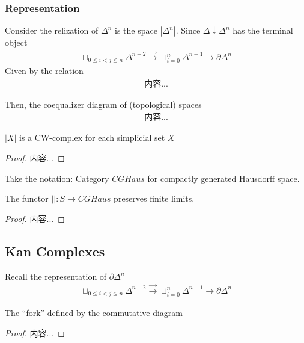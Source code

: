 \documentclass[Total.tex]{subfiles}
\begin{document}
			\subsubsection{Representation}
				Consider the relization of $\Delta^n$ is the space $|\Delta^n|$. Since $\Delta\downarrow \Delta^n$ has the terminal object
				\begin{gather*}
					\sqcup_{0\leq i<j\leq n}\Delta^{n-2}\stackrel{\rightarrow}{\rightarrow} \sqcup_{i=0}^n \Delta^{n-1}\rightarrow \partial \Delta^n
				\end{gather*}
				Given by the relation
				\begin{gather*}
					内容...
				\end{gather*}
				
				Then, the coequalizer diagram of (topological) spaces
				\begin{gather*}
					内容...
				\end{gather*}
			\begin{proposition}
				$|X|$ is a CW-complex for each simplicial set $X$
			\end{proposition}
			\begin{proof}
				内容...
			\end{proof}
			\begin{Def}
				Take the notation: Category $CGHaus$ for compactly generated Hausdorff space.
			\end{Def}
			
			\begin{proposition}
				The functor $||:S\rightarrow CGHaus$ preserves finite limits.
			\end{proposition}
			\begin{proof}
				内容...
			\end{proof}
			\subsection{Kan Complexes}
				Recall the representation of $\partial \Delta^n$
				\begin{gather*}
					\sqcup_{0\leq i<j\leq n} \Delta^{n-2}\stackrel{\rightarrow}{\rightarrow} \sqcup_{i=0}^n \Delta^{n-1}\rightarrow \partial \Delta^n
				\end{gather*}
				
				\begin{lemma} The “fork” defined by the commutative diagram
					\begin{center}
					\end{center}
				\end{lemma}
				\begin{proof}
					内容...
				\end{proof}
				
\end{document}
